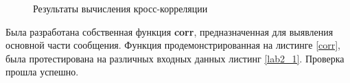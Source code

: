 \documentclass[a4paper,14pt]{extarticle}
\begin{document}
\begin{figure}[h]
\begin{minipage}[h]{0.49\linewidth}
\end{minipage}
\hfill
\begin{minipage}[h]{0.49\linewidth}
\end{minipage}
\caption{Результаты вычисления кросс-корреляции}
\label{014}
\end{figure}

Была разработана собственная функция \textbf{corr}, предназначенная для выявления основной части сообщения. Функция продемонстрированная на листинге \ref{corr}, была протестирована на различных входных данных листинг \ref{lab2_1}. Проверка прошла успешно.
\end{document}
